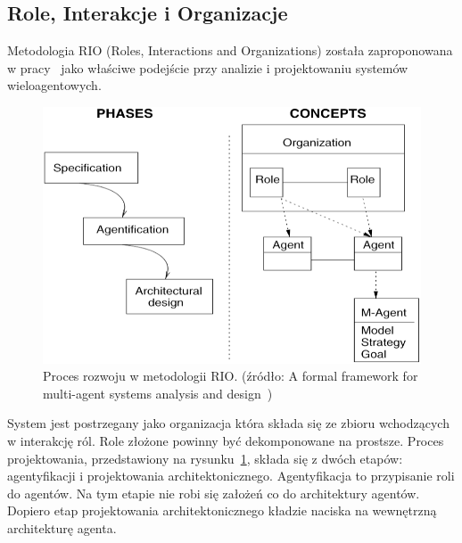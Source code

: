 \documentclass[11pt]{report}
\begin{document}
    \subsection{Role, Interakcje i Organizacje}
    Metodologia RIO (Roles, Interactions and Organizations) została zaproponowana w pracy~\cite{S095741740200070220020101} jako właściwe podejście przy analizie
    i projektowaniu systemów wieloagentowych.
    \begin{figure}[!ht]
        \centering
        \includegraphics[width=\linewidth]{fig/RIO approach.png}
        \caption{Proces rozwoju w metodologii RIO. (źródło: A formal framework for multi-agent systems analysis and design~\cite{S095741740200070220020101})}
        \label{fig:rio}
    \end{figure}
    System jest postrzegany jako organizacja która składa się ze zbioru wchodzących w interakcję ról.
    Role złożone powinny być dekomponowane na prostsze.
    Proces projektowania, przedstawiony na rysunku~\ref{fig:rio}, składa się z dwóch etapów: agentyfikacji i projektowania architektonicznego.
    Agentyfikacja to przypisanie roli do agentów.
    Na tym etapie nie robi się założeń co do architektury agentów.
    Dopiero etap projektowania architektonicznego kładzie naciska na wewnętrzną architekturę agenta.
\end{document}
